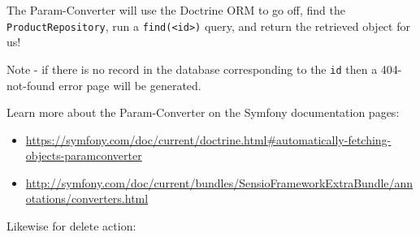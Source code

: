 \documentclass[a4paperpaper,openright]{book}
\newenvironment{Shaded}{}{}
\newcommand{\AnnotationTok}[1]{\textcolor[rgb]{0.38,0.63,0.69}{\textbf{\textit{#1}}}}
\newcommand{\CommentTok}[1]{\textcolor[rgb]{0.38,0.63,0.69}{\textit{#1}}}
\newcommand{\FunctionTok}[1]{\textcolor[rgb]{0.02,0.16,0.49}{#1}}
\newcommand{\KeywordTok}[1]{\textcolor[rgb]{0.00,0.44,0.13}{\textbf{#1}}}
\newcommand{\NormalTok}[1]{#1}
\newcommand{\OtherTok}[1]{\textcolor[rgb]{0.00,0.44,0.13}{#1}}
\newcommand{\StringTok}[1]{\textcolor[rgb]{0.25,0.44,0.63}{#1}}
\begin{document}
The Param-Converter will use the Doctrine ORM to go off, find the
\texttt{ProductRepository}, run a
\texttt{find(\textless{}id\textgreater{})} query, and return the
retrieved object for us!

Note - if there is no record in the database corresponding to the
\texttt{id} then a 404-not-found error page will be generated.

Learn more about the Param-Converter on the Symfony documentation pages:

\begin{itemize}
\item
  \url{https://symfony.com/doc/current/doctrine.html\#automatically-fetching-objects-paramconverter}
\item
  \url{http://symfony.com/doc/current/bundles/SensioFrameworkExtraBundle/annotations/converters.html}
\end{itemize}

Likewise for delete action:

\begin{Shaded}
\end{Shaded}
\end{document}
